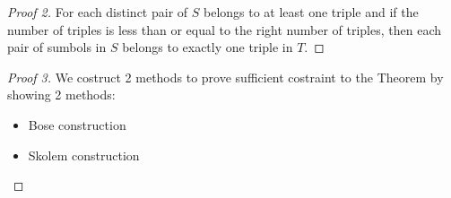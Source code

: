 \begin{frame}
\begin{proof}[Proof 2]
	For each distinct pair of $S$ belongs to at least one triple and if the number of triples is less than or equal to the right number of triples, then each pair of sumbols in $S$ belongs to exactly one triple in $T$.
\end{proof}

\begin{proof}[Proof 3]
	We costruct 2 methods to prove sufficient costraint to the Theorem by showing 2 methods:
	\begin{itemize}
		\item Bose construction
		\item Skolem construction
	\end{itemize}
\end{proof}
\end{frame}